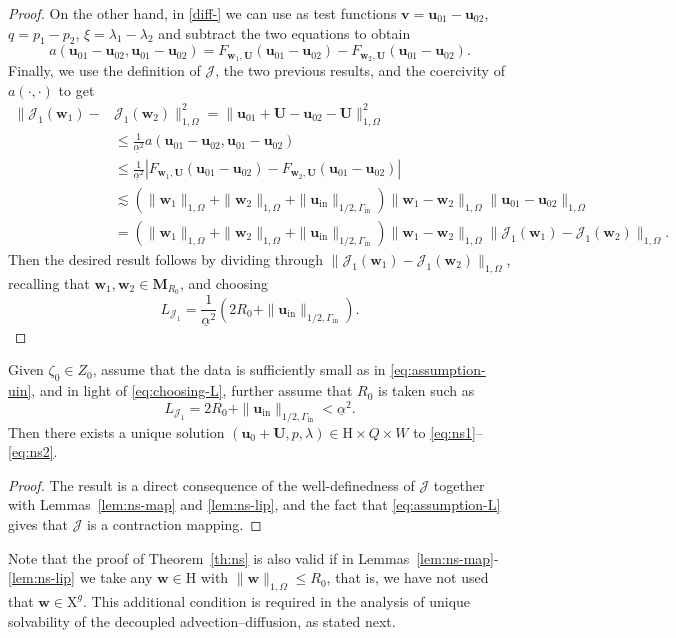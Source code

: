 \documentclass[onefignum,onetabnum,reqno,a4paper,final]{siamart250211}
\newcommand\bu{\boldsymbol{u}}
\newcommand\bv{\boldsymbol{v}}
\newcommand\bw{\boldsymbol{w}}
\newcommand\bM{\mathbf{M}}
\newcommand\0{\mathbf{0}}
\newcommand\bU{\boldsymbol{U}}
\newcommand\bH{\boldsymbol{\mathrm{H}}}
\newcommand\bX{\boldsymbol{\mathrm{X}}}
\newcommand\Gi{\Gamma_{\mathrm{in}}}
\newcommand\buin{\boldsymbol{u}_{\mathrm{in}}}
\newcommand{\cred}[1]{{\leavevmode\color{red}{#1}}}
\numberwithin{figure}{section}
\numberwithin{table}{section}
\begin{document}
\begin{proof}
On the other hand, in \eqref{diff-} we can use as test functions $\bv =\bu_{01}-\bu_{02} $, $q = p_1-p_2$, $\xi = \lambda_1-\lambda_2$ and subtract the two equations  to obtain 
\[
    a(\bu_{01}-\bu_{02},\bu_{01}-\bu_{02}) = F_{\bw_1,\bU}(\bu_{01}-\bu_{02}) -F_{\bw_2,\bU}(\bu_{01}-\bu_{02}). 
\]
Finally, we use the definition of $\mathcal{J}$, the two previous results, and the coercivity of  $a(\cdot,\cdot)$ to get 
\begin{align*}
    \|\mathcal{J}_1(\bw_1)- &\mathcal{J}_1(\bw_2)\|^2_{1,\Omega}  = \|\bu_{01}+\bU-\bu_{02}-\bU\|^2_{1,\Omega} \\
    & \leq \frac{1}{\underline{\alpha}^2}  a(\bu_{01}-\bu_{02},\bu_{01}-\bu_{02}) \\
    & \leq  \frac{1}{\underline{\alpha}^2} | F_{\bw_1,\bU}(\bu_{01}-\bu_{02}) -F_{\bw_2,\bU}(\bu_{01}-\bu_{02})| \\
    & \lesssim (\|\bw_1\|_{1,\Omega} + \|\bw_2\|_{1,\Omega} + \|\buin\|_{1/2,\Gi}) \|\bw_1-\bw_2\|_{1,\Omega}\|\bu_{01}-\bu_{02}\|_{1,\Omega} \\
    & = (\|\bw_1\|_{1,\Omega} + \|\bw_2\|_{1,\Omega} + \|\buin\|_{1/2,\Gi}) \|\bw_1-\bw_2\|_{1,\Omega}\|\mathcal{J}_1(\bw_1)- \mathcal{J}_1(\bw_2)\|_{1,\Omega}.
\end{align*}
Then the desired result follows by dividing through $\|\mathcal{J}_1(\bw_1)- \mathcal{J}_1(\bw_2)\|_{1,\Omega}$,   recalling that $\bw_1,\bw_2\in \bM_{R_0}$, and choosing 
\begin{equation}\label{eq:choosing-L} L_{\mathcal{J}_1} =  \frac{1}{\underline{\alpha}^2}(2R_0 + \|\buin\|_{1/2,\Gi}). \end{equation}
\end{proof}

\begin{theorem}\label{th:ns}
Given $\zeta_0\in Z_0$, assume that the data is sufficiently small as in \eqref{eq:assumption-uin}, and in light of \eqref{eq:choosing-L}, further assume that $R_0$ is taken such as 
 \begin{equation}\label{eq:assumption-L}
L_{\mathcal{J}_1}= 2R_0 + \|\buin\|_{1/2,\Gi}  < \underline{\alpha}^2. 
 \end{equation}
 Then there exists a unique solution $(\bu_0+\bU,p,\lambda) \in \bH \times Q \times W$ to \eqref{eq:ns1}--\eqref{eq:ns2}. 
\end{theorem}
\begin{proof}
The result is a direct consequence of the well-definedness of $\mathcal{J}$ together with Lemmas~\ref{lem:ns-map} and \ref{lem:ns-lip}, and the fact that \eqref{eq:assumption-L} gives that  $\mathcal{J}$ is a contraction mapping. 
\end{proof}
Note that the proof of Theorem~\ref{th:ns} is also valid if in Lemmas~\ref{lem:ns-map}-\ref{lem:ns-lip} we take any $\bw\in \bH$ with $\|\bw\|_{1,\Omega}\leq R_0$, that is, we have not used that $\bw\in \bX^g$. This additional condition is required in the  analysis of unique solvability of the decoupled advection--diffusion, as stated next. 
\end{document}
